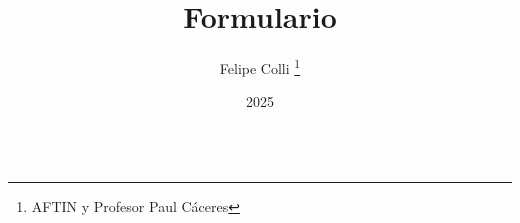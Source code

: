 \documentclass[11pt]{article}
\title{Formulario}
\author{Felipe Colli \thanks{AFTIN y Profesor Paul Cáceres}}
\date{2025}
\begin{document}
\maketitle

\[\]
\end{document}
